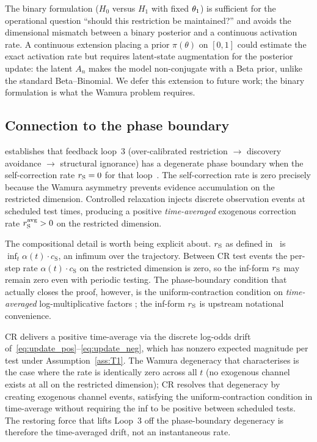 \begin{remark}
\label{rem:continuous_extension}
The binary formulation ($H_0$ versus $H_1$ with fixed $\theta_1$)
is sufficient for the operational question ``should this
restriction be maintained?'' and avoids the dimensional mismatch
between a binary posterior and a continuous activation rate.  A
continuous extension placing a prior $\pi(\theta)$ on $[0,1]$
could estimate the exact activation rate but requires latent-state
augmentation for the posterior update: the latent $A_n$ makes the
model non-conjugate with a Beta prior, unlike the standard
Beta--Binomial.  We defer this extension to future work; the
binary formulation is what the Wamura problem requires.
\end{remark}

\subsection{Connection to the phase boundary}
\label{sec:connection_phase_boundary}

\citet{lasser2026phase} establishes that feedback loop~3
(over-calibrated restriction $\to$ discovery avoidance $\to$
structural ignorance) has a degenerate phase boundary when the
self-correction rate $r_{\mathrm{S}} = 0$ for that
loop~\citep[Proposition~4]{lasser2026phase}.  The self-correction
rate is zero precisely because the Wamura asymmetry prevents
evidence accumulation on the restricted dimension.  Controlled
relaxation injects discrete observation events at scheduled test
times, producing a positive \emph{time-averaged} exogenous
correction rate $r_{\mathrm{S}}^{\mathrm{avg}} > 0$ on the restricted
dimension.

The compositional detail is worth being explicit about.  $r_{\mathrm{S}}$
as defined in~\citep{lasser2026phase} is
$\inf_t \alpha(t) \cdot c_{\mathrm{S}}$, an infimum over the
trajectory.  Between CR test events the per-step rate
$\alpha(t) \cdot c_{\mathrm{S}}$ on the restricted dimension is
zero, so the inf-form $r_{\mathrm{S}}$ may remain zero even with periodic
testing.  The phase-boundary condition that actually closes the
proof, however, is the uniform-contraction condition on
\emph{time-averaged} log-multiplicative factors
\citep[Theorem~1(a) and Eq.~30]{lasser2026phase}; the inf-form
$r_{\mathrm{S}}$ is upstream notational convenience.

CR delivers a positive time-average via the discrete log-odds
drift of~\eqref{eq:update_pos}--\eqref{eq:update_neg}, which has
nonzero expected magnitude per test under
Assumption~\ref{ass:T1}.  The Wamura degeneracy that
\citep[Proposition~4]{lasser2026phase} characterises is the case
where the rate is identically zero across all $t$ (no exogenous
channel exists at all on the restricted dimension); CR resolves
that degeneracy by creating exogenous channel events, satisfying
the uniform-contraction condition in time-average without
requiring the inf to be positive between scheduled tests.  The
restoring force that lifts Loop~3 off the phase-boundary
degeneracy is therefore the time-averaged drift, not an
instantaneous rate.

